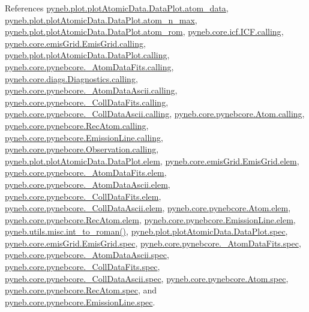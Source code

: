 References \hyperlink{plot_atomic_data_8py_source_l00071}{pyneb.\+plot.\+plot\+Atomic\+Data.\+Data\+Plot.\+atom\+\_\+data}, \hyperlink{plot_atomic_data_8py_source_l00105}{pyneb.\+plot.\+plot\+Atomic\+Data.\+Data\+Plot.\+atom\+\_\+n\+\_\+max}, \hyperlink{plot_atomic_data_8py_source_l00102}{pyneb.\+plot.\+plot\+Atomic\+Data.\+Data\+Plot.\+atom\+\_\+rom}, \hyperlink{icf_8py_source_l00016}{pyneb.\+core.\+icf.\+I\+C\+F.\+calling}, \hyperlink{emis_grid_8py_source_l00041}{pyneb.\+core.\+emis\+Grid.\+Emis\+Grid.\+calling}, \hyperlink{plot_atomic_data_8py_source_l00042}{pyneb.\+plot.\+plot\+Atomic\+Data.\+Data\+Plot.\+calling}, \hyperlink{pynebcore_8py_source_l00090}{pyneb.\+core.\+pynebcore.\+\_\+\+Atom\+Data\+Fits.\+calling}, \hyperlink{diags_8py_source_l00169}{pyneb.\+core.\+diags.\+Diagnostics.\+calling}, \hyperlink{pynebcore_8py_source_l00311}{pyneb.\+core.\+pynebcore.\+\_\+\+Atom\+Data\+Ascii.\+calling}, \hyperlink{pynebcore_8py_source_l00568}{pyneb.\+core.\+pynebcore.\+\_\+\+Coll\+Data\+Fits.\+calling}, \hyperlink{pynebcore_8py_source_l00918}{pyneb.\+core.\+pynebcore.\+\_\+\+Coll\+Data\+Ascii.\+calling}, \hyperlink{pynebcore_8py_source_l01175}{pyneb.\+core.\+pynebcore.\+Atom.\+calling}, \hyperlink{pynebcore_8py_source_l02572}{pyneb.\+core.\+pynebcore.\+Rec\+Atom.\+calling}, \hyperlink{pynebcore_8py_source_l03263}{pyneb.\+core.\+pynebcore.\+Emission\+Line.\+calling}, \hyperlink{pynebcore_8py_source_l03419}{pyneb.\+core.\+pynebcore.\+Observation.\+calling}, \hyperlink{plot_atomic_data_8py_source_l00045}{pyneb.\+plot.\+plot\+Atomic\+Data.\+Data\+Plot.\+elem}, \hyperlink{emis_grid_8py_source_l00045}{pyneb.\+core.\+emis\+Grid.\+Emis\+Grid.\+elem}, \hyperlink{pynebcore_8py_source_l00083}{pyneb.\+core.\+pynebcore.\+\_\+\+Atom\+Data\+Fits.\+elem}, \hyperlink{pynebcore_8py_source_l00304}{pyneb.\+core.\+pynebcore.\+\_\+\+Atom\+Data\+Ascii.\+elem}, \hyperlink{pynebcore_8py_source_l00560}{pyneb.\+core.\+pynebcore.\+\_\+\+Coll\+Data\+Fits.\+elem}, \hyperlink{pynebcore_8py_source_l00910}{pyneb.\+core.\+pynebcore.\+\_\+\+Coll\+Data\+Ascii.\+elem}, \hyperlink{pynebcore_8py_source_l01165}{pyneb.\+core.\+pynebcore.\+Atom.\+elem}, \hyperlink{pynebcore_8py_source_l02565}{pyneb.\+core.\+pynebcore.\+Rec\+Atom.\+elem}, \hyperlink{pynebcore_8py_source_l03267}{pyneb.\+core.\+pynebcore.\+Emission\+Line.\+elem}, \hyperlink{misc_8py_source_l00013}{pyneb.\+utils.\+misc.\+int\+\_\+to\+\_\+roman()}, \hyperlink{plot_atomic_data_8py_source_l00046}{pyneb.\+plot.\+plot\+Atomic\+Data.\+Data\+Plot.\+spec}, \hyperlink{emis_grid_8py_source_l00046}{pyneb.\+core.\+emis\+Grid.\+Emis\+Grid.\+spec}, \hyperlink{pynebcore_8py_source_l00084}{pyneb.\+core.\+pynebcore.\+\_\+\+Atom\+Data\+Fits.\+spec}, \hyperlink{pynebcore_8py_source_l00305}{pyneb.\+core.\+pynebcore.\+\_\+\+Atom\+Data\+Ascii.\+spec}, \hyperlink{pynebcore_8py_source_l00561}{pyneb.\+core.\+pynebcore.\+\_\+\+Coll\+Data\+Fits.\+spec}, \hyperlink{pynebcore_8py_source_l00911}{pyneb.\+core.\+pynebcore.\+\_\+\+Coll\+Data\+Ascii.\+spec}, \hyperlink{pynebcore_8py_source_l01166}{pyneb.\+core.\+pynebcore.\+Atom.\+spec}, \hyperlink{pynebcore_8py_source_l02566}{pyneb.\+core.\+pynebcore.\+Rec\+Atom.\+spec}, and \hyperlink{pynebcore_8py_source_l03268}{pyneb.\+core.\+pynebcore.\+Emission\+Line.\+spec}.



